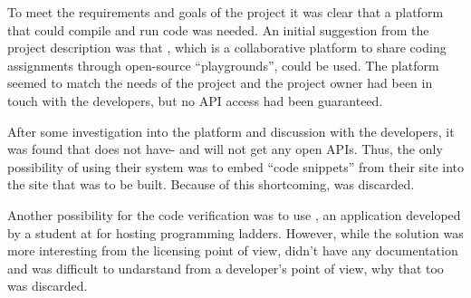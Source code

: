 To meet the requirements and goals of the project it was clear that a platform that could compile and run code was needed. An initial suggestion from the project description was that \techio{}, which is a collaborative platform to share coding assignments through open-source ``playgrounds'', could be used. The platform seemed to match the needs of the project and the project owner had been in touch with the developers, but no API access had been guaranteed. 

After some investigation into the platform and discussion with the developers, it was found that \techio{} does not have- and will not get any open APIs. Thus, the only possibility of using their system was to  embed ``code snippets'' from their site into the site that was to be built. Because of this shortcoming, \techio{} was discarded.

Another possibility for the code verification was to use \sockr{}, an application developed by a student at \LTU{} for hosting programming ladders. However, while the solution was more interesting from the licensing point of view, \sockr{} didn't have any documentation and was difficult to undarstand from a developer's point of view, why that too was discarded.


